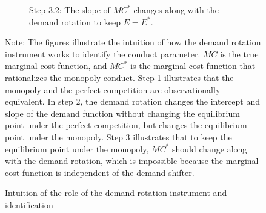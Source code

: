 \documentclass[11pt, a4paper]{article}
\begin{document}
\begin{figure}[p!]
\begin{center}
\begin{subfigure}[b]{0.45\textwidth}
            \caption{Step 3.2: The slope of $MC^{*}$ changes along with the demand rotation to keep $E = E^{*}$.}
            \label{fig:identification_example_step_3_2}
        \end{subfigure}
    \end{center}
    \caption{Intuition of the role of the demand rotation instrument and identification}
    \label{fig:identification_example}
    \vspace{2mm}
    \footnotesize
    Note: The figures illustrate the intuition of how the demand rotation instrument works to identify the conduct parameter.
    $MC$ is the true marginal cost function, and $MC^{*}$ is the marginal cost function that rationalizes the monopoly conduct.
    Step 1 illustrates that the monopoly and the perfect competition are observationally equivalent.
    In step 2, the demand rotation changes the intercept and slope of the demand function without changing the equilibrium point under the perfect competition, but changes the equilibrium point under the monopoly.
    Step 3 illustrates that to keep the equilibrium point under the monopoly, $MC^{*}$ should change along with the demand rotation, which is impossible because the marginal cost function is independent of the demand shifter.
\end{figure}
\end{document}
